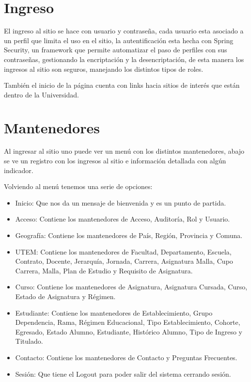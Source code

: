\documentclass[a4paper,12pt,openany,oneside]{book}
\begin{document}
\section{Ingreso}
El ingreso al sitio se hace con usuario y contraseña, cada usuario esta asociado a un perfil que limita el uso en el sitio, la autentificación esta hecha con Spring Security, un framework que permite automatizar el paso de perfiles con sus contraseñas, gestionando la encriptación y la desencriptación, de esta manera los ingresos al sitio son seguros, manejando los distintos tipos de roles.

También el inicio de la página cuenta con links hacia sitios de interés que están dentro de la Universidad.
\section{Mantenedores}
Al ingresar al sitio uno puede ver un menú con los distintos mantenedores, abajo se ve un registro con los ingresos al sitio e información detallada con algún indicador.

Volviendo al menú tenemos una serie de opciones:

\begin{itemize}
	\item Inicio: Que nos da un mensaje de bienvenida y es un punto de partida.
	\item Acceso: Contiene los mantenedores de Acceso, Auditoría, Rol y Usuario.
	\item Geografía: Contiene los mantenedores de País, Región, Provincia y Comuna.
	\item UTEM: Contiene los mantenedores de Facultad, Departamento, Escuela, Contrato, Docente, Jerarquía, Jornada, Carrera, Asignatura Malla, Cupo Carrera, Malla, Plan de Estudio y Requisito de Asignatura.
	\item Curso: Contiene los mantenedores de Asignatura, Asignatura Cursada, Curso, Estado de Asignatura y Régimen.
	\item Estudiante: Contiene los mantenedores de Establecimiento, Grupo Dependencia, Rama, Régimen Educacional, Tipo Establecimiento, Cohorte, Egresado, Estado Alumno, Estudiante, Histórico Alumno, Tipo de Ingreso y Titulado.
	\item Contacto: Contiene los mantenedores de Contacto y Preguntas Frecuentes.
	\item Sesión: Que tiene el Logout para poder salir del sistema cerrando sesión.
\end{itemize}
\end{document}
